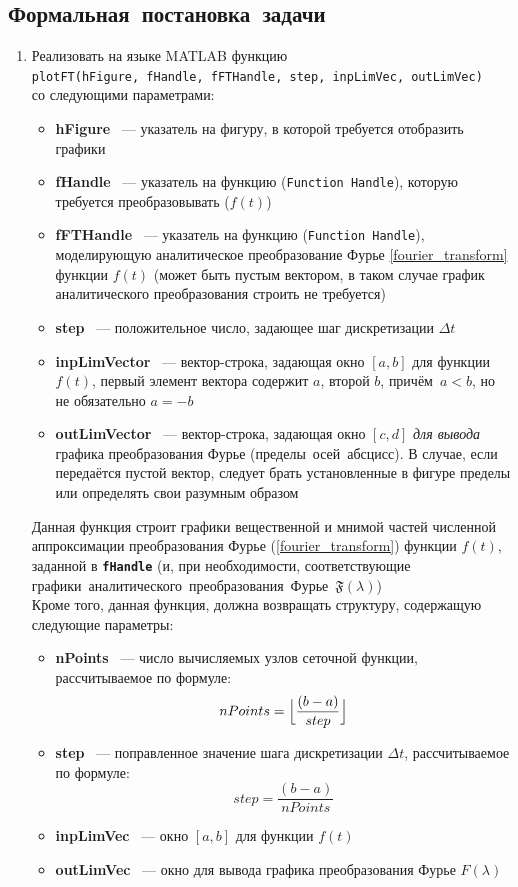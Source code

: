 \documentclass[11pt, oneside, draft]{article}
\numberwithin{equation}{section}
\newcommand \bitem[1][]{\item \textbf{#1}}
\newcommand \four[1][\lambda]{\mathfrak{F}(#1)}
\newcommand \fft[1][\lambda]{F(#1)}
\begin{document}
\subsection{Формальная~постановка~задачи}
\begin{enumerate}
	\item Реализовать на языке MATLAB функцию \\\texttt{plotFT(hFigure,~fHandle,~fFTHandle,~step,~inpLimVec,~outLimVec)} \\со следующими параметрами:
	\begin{itemize}
		\bitem[hFigure] ~--- указатель на фигуру, в которой требуется отобразить графики
		\bitem[fHandle] ~--- указатель на функцию (\texttt{Function Handle}), которую требуется преобразовывать (\(f(t)\))
		\bitem[fFTHandle] ~--- указатель на функцию (\texttt{Function Handle}), моделирующую аналитическое преобразование Фурье \eqref{fourier_transform} функции \(f(t)\) 
		(может быть пустым вектором, в таком случае график аналитического преобразования строить не требуется)
		\bitem[step] ~--- положительное число, задающее шаг дискретизации \(\Delta t\)
		\bitem[inpLimVector] ~--- вектор-строка, задающая окно \([a, b]\) для функции \(f(t)\), первый элемент вектора содержит \(a\), второй \(b\), причём~\(a < b\), но не обязательно \(a = -b\)
		\bitem[outLimVector] ~--- вектор-строка, задающая окно \([c, d]\) \textit{для вывода} графика преобразования Фурье (пределы~осей~абсцисс). 
		В случае, если передаётся пустой вектор, следует брать установленные в фигуре пределы или определять свои разумным образом
	\end{itemize}
	Данная функция строит графики вещественной и мнимой частей численной аппроксимации преобразования Фурье (\ref{fourier_transform}) функции \(f(t)\), заданной в \textbf{\texttt{fHandle}}
	 (и, при необходимости, соответствующие графики~аналитического~преобразования~Фурье~\(\four\)) \\
	 Кроме того, данная функция, должна возвращать структуру, содержащую следующие параметры: 
	\begin{itemize}
		\bitem[nPoints] ~--- число вычисляемых узлов сеточной функции, рассчитываемое по формуле: 
		\[ nPoints = \Bigl\lfloor {\dfrac{(b - a)}{step}}\Bigr\rfloor \]
		\bitem[step] ~--- поправленное значение шага дискретизации \(\Delta t\), рассчитываемое по формуле: \[step= \dfrac{(b - a)}{nPoints}\]
		\bitem[inpLimVec] ~---  окно \([a, b]\) для функции \(f(t)\)
		\bitem[outLimVec] ~--- окно для вывода графика преобразования Фурье \(\fft\)
	\end{itemize}

\end{enumerate}
\end{document}
